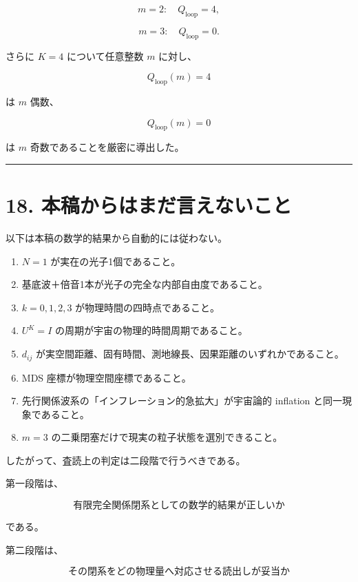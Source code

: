 \documentclass[
  a4paper,
]{ltjsarticle}
\providecommand{\tightlist}{%
  \setlength{\itemsep}{0pt}\setlength{\parskip}{0pt}}
\begin{document}
\[
m=2:
\quad
Q_{\mathrm{loop}}=4,
\]

\[
m=3:
\quad
Q_{\mathrm{loop}}=0.
\]

さらに \(K=4\) について任意整数 \(m\) に対し、

\[
Q_{\mathrm{loop}}(m)
=
4
\]

は \(m\) 偶数、

\[
Q_{\mathrm{loop}}(m)
=
0
\]

は \(m\) 奇数であることを厳密に導出した。

\begin{center}\rule{0.5\linewidth}{0.5pt}\end{center}

\section{18.
本稿からはまだ言えないこと}\label{ux672cux7a3fux304bux3089ux306fux307eux3060ux8a00ux3048ux306aux3044ux3053ux3068}

以下は本稿の数学的結果から自動的には従わない。

\begin{enumerate}
\def\labelenumi{\arabic{enumi}.}
\tightlist
\item
  \(N=1\) が実在の光子1個であること。
\item
  基底波＋倍音1本が光子の完全な内部自由度であること。
\item
  \(k=0,1,2,3\) が物理時間の四時点であること。
\item
  \(U^K=I\) の周期が宇宙の物理的時間周期であること。
\item
  \(d_{ij}\)
  が実空間距離、固有時間、測地線長、因果距離のいずれかであること。
\item
  MDS 座標が物理空間座標であること。
\item
  先行関係波系の「インフレーション的急拡大」が宇宙論的 inflation
  と同一現象であること。
\item
  \(m=3\) の二乗閉塞だけで現実の粒子状態を選別できること。
\end{enumerate}

したがって、査読上の判定は二段階で行うべきである。

第一段階は、

\[
\boxed{
\text{有限完全関係閉系としての数学的結果が正しいか}
}
\]

である。

第二段階は、

\[
\boxed{
\text{その閉系をどの物理量へ対応させる読出しが妥当か}
}
\]
\end{document}
